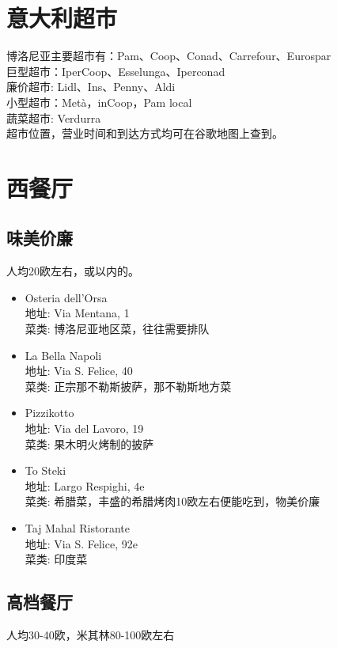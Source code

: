 \section{意大利超市}
\noindent 博洛尼亚主要超市有：Pam、Coop、Conad、Carrefour、Eurospar\\
巨型超市：IperCoop、Esselunga、Iperconad\\
廉价超市: Lidl、Ins、Penny、Aldi\\
小型超市：Metà，inCoop，Pam local\\
蔬菜超市: Verdurra\\
超市位置，营业时间和到达方式均可在谷歌地图上查到。

\section{西餐厅}

\subsection{味美价廉}
人均20欧左右，或以内的。

\begin{itemize}
\item Osteria dell'Orsa\\
地址: Via Mentana, 1\\
菜类: 博洛尼亚地区菜，往往需要排队

\item La Bella Napoli\\
地址: Via S. Felice, 40\\
菜类: 正宗那不勒斯披萨，那不勒斯地方菜

\item Pizzikotto\\
地址: Via del Lavoro, 19\\
菜类: 果木明火烤制的披萨

\item To Steki\\
地址: Largo Respighi, 4e\\
菜类: 希腊菜，丰盛的希腊烤肉10欧左右便能吃到，物美价廉

\item Taj Mahal Ristorante\\
地址: Via S. Felice, 92e\\
菜类: 印度菜

\end{itemize}

\subsection{高档餐厅}
人均30-40欧，米其林80-100欧左右

